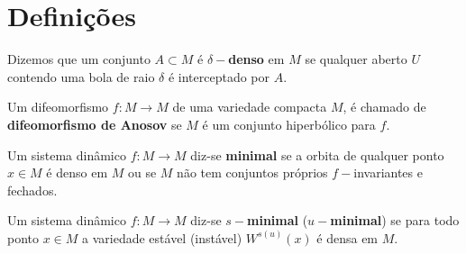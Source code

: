 

\chapter{Definições}

\begin{definicao} Dizemos que um conjunto $A\subset M$ é \textbf{$\delta-$denso} em $M$ se qualquer aberto $U$ contendo  uma bola de raio $\delta$ é interceptado por $A$.
\end{definicao}


\begin{definicao} Um difeomorfismo $f:M\to M$ de uma variedade compacta $M$, é chamado de \textbf{difeomorfismo de Anosov} se $M$ é um conjunto hiperbólico para $f$.
\end{definicao}

\begin{definicao} Um sistema dinâmico $f:M\to M$ diz-se \textbf{minimal} se a orbita de qualquer ponto $x\in M$ é denso em $M$ ou se $M$ não tem conjuntos próprios $f-$invariantes e fechados.
\end{definicao}

\begin{definicao} Um sistema dinâmico $f:M\to M$ diz-se \textbf{$s-$minimal} (\textbf{$u-$minimal}) se para todo ponto $x\in M$ a variedade estável (instável) $W^{s(u)}(x)$ é densa em $M$.
\end{definicao}












